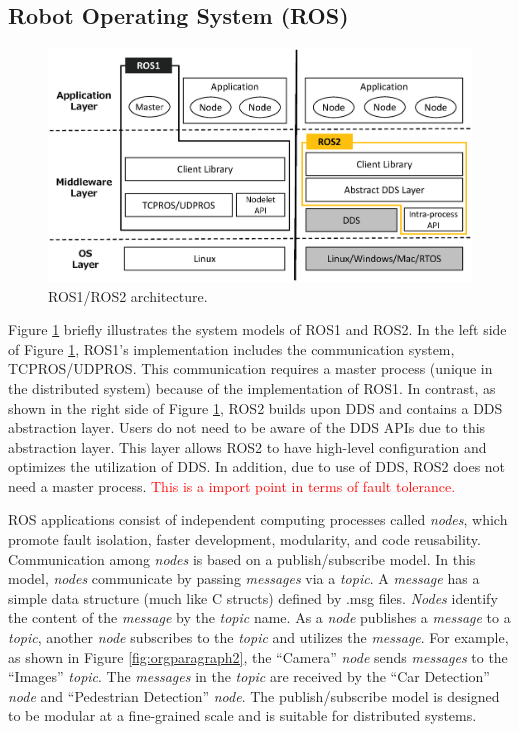 \documentclass{sig-alternate-05-2015}
\begin{document}
\vspace{-1mm}
\subsection{Robot Operating System (ROS)}
\label{sec:orgheadline6}

\begin{figure}[t]
  \centering
  \includegraphics[width=0.9\linewidth]{../figure/ros_architecture.eps}
  \vspace{-5mm}
  \caption{\label{fig:orgparagraph1}
    ROS1/ROS2 architecture.}
  \vspace{-6mm}
\end{figure}   

Figure \ref{fig:orgparagraph1} briefly illustrates the system models of ROS1 and ROS2. 
In the left side of Figure \ref{fig:orgparagraph1}, ROS1's implementation includes the communication system, TCPROS/UDPROS.
This communication requires a master process (unique in the distributed system) because of the implementation of ROS1.
In contrast, as shown in the right side of Figure \ref{fig:orgparagraph1}, ROS2 builds upon DDS and contains a DDS abstraction layer. 
Users do not need to be aware of the DDS APIs due to this abstraction layer.
This layer allows ROS2 to have high-level configuration and optimizes the utilization of DDS. 
In addition, due to use of DDS, ROS2 does not need a master process.
\textcolor{red}{This is a import point in terms of fault tolerance.}

ROS applications consist of independent computing processes called \emph{nodes}, which promote fault isolation, faster development, modularity, and code reusability. 
Communication among \emph{nodes} is based on a publish/subscribe model. 
In this model, \emph{nodes} communicate by passing \emph{messages} via a \emph{topic}. 
A \emph{message} has a simple data structure (much like C structs) defined by .msg files.
\emph{Nodes} identify the content of the \emph{message} by the \emph{topic} name.
As a \emph{node} publishes a \emph{message} to a \emph{topic}, another \emph{node} subscribes to the \emph{topic} and utilizes the \emph{message}. 
For example, as shown in Figure \ref{fig:orgparagraph2}, the ``Camera'' \emph{node} sends \emph{messages} to the ``Images'' \emph{topic}. 
The \emph{messages} in the \emph{topic} are received by the ``Car Detection'' \emph{node}  and ``Pedestrian Detection'' \emph{node}.
The publish/subscribe model is designed to be modular at a fine-grained scale and is suitable for distributed systems.
\end{document}
